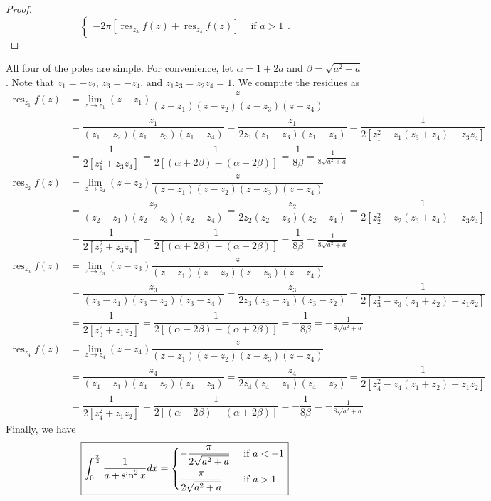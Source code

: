 \documentclass[10pt]{article}
\newcommand{\Int}{\displaystyle\int}
\DeclareMathOperator*{\res}{res}
\begin{document}
\begin{enumerate}
\begin{proof}
$$\begin{cases}
-2\pi [\res\nolimits_{z_3} f(z) + \res\nolimits_{z_4} f(z) ] & \text{ if } a > 1
\end{cases}.
$$
\end{proof}
All four of the poles are simple.  For convenience, let $\alpha = 1+2a$ and $\beta = \sqrt{a^2 + a}$.  Note that $z_1 = - z_2$, $z_3 = - z_4$, and $z_1z_3 = z_2z_4 = 1$.  We compute the residues as
\begin{align*}
\res\nolimits_{z_1} f(z) &= \lim_{z \rightarrow z_1} (z - z_1) \dfrac{z}{(z - z_1) (z - z_2) (z - z_3) (z - z_4)}
\\
&= \dfrac{z_1}{(z_1 - z_2) (z_1 - z_3) (z_1 - z_4)}
= \dfrac{z_1}{2z_1 (z_1 - z_3) (z_1 - z_4)}
= \dfrac{1}{2[z_1^2 - z_1(z_3 + z_4) + z_3z_4]}
\\
&= \dfrac{1}{2[z_1^2 + z_3z_4]}
= \dfrac{1}{2[(\alpha + 2 \beta) - (\alpha - 2\beta)]}
= \dfrac{1}{8\beta}
= \boxed{\frac{1}{8\sqrt{a^2 + a}}}
\\
\res\nolimits_{z_2} f(z) &= \lim_{z \rightarrow z_2} (z - z_2) \dfrac{z}{(z - z_1) (z - z_2) (z - z_3) (z - z_4)}
\\
&= \dfrac{z_2}{(z_2 - z_1) (z_2 - z_3) (z_2 - z_4)}
= \dfrac{z_2}{2z_2(z_2 - z_3) (z_2 - z_4)}
= \dfrac{1}{2[z_2^2 - z_2(z_3 + z_4) + z_3z_4]}
\\
&= \dfrac{1}{2[z_2^2 + z_3z_4]}
= \dfrac{1}{2[(\alpha + 2 \beta) - (\alpha - 2\beta)]}
= \dfrac{1}{8\beta}
= \boxed{\frac{1}{8\sqrt{a^2 + a}}}
\\
\res\nolimits_{z_3} f(z) &= \lim_{z \rightarrow z_3} (z - z_3) \dfrac{z}{(z - z_1) (z - z_2) (z - z_3) (z - z_4)}
\\
&= \dfrac{z_3}{(z_3 - z_1) (z_3 - z_2) (z_3 - z_4)}
= \dfrac{z_3}{2z_3(z_3 - z_1) (z_3 - z_2)}
= \dfrac{1}{2[z_3^2 - z_3(z_1 + z_2) + z_1z_2]}
\\
&= \dfrac{1}{2[z_3^2 + z_1z_2]}
= \dfrac{1}{2[(\alpha - 2 \beta) - (\alpha + 2\beta)]}
= -\dfrac{1}{8\beta}
= \boxed{-\frac{1}{8\sqrt{a^2 + a}}}
\\
\res\nolimits_{z_4} f(z) &= \lim_{z \rightarrow z_4} (z - z_4) \dfrac{z}{(z - z_1) (z - z_2) (z - z_3) (z - z_4)}
\\
&= \dfrac{z_4}{(z_4 - z_1) (z_4 - z_2) (z_4 - z_3)}
= \dfrac{z_4}{2z_4(z_4 - z_1) (z_4 - z_2)}
= \dfrac{1}{2[z_4^2 - z_4(z_1 + z_2) + z_1z_2]}
\\
&= \dfrac{1}{2[z_4^2 + z_1z_2]}
= \dfrac{1}{2[(\alpha - 2 \beta) - (\alpha + 2\beta)]}
= -\dfrac{1}{8\beta}
= \boxed{-\frac{1}{8\sqrt{a^2 + a}}}
\end{align*}
Finally, we have
$$
\boxed{
\Int_0^{\frac{\pi}{2}} \frac{1}{a + \sin^2 x} dx
=
\begin{cases}
- \dfrac{\pi}{2 \sqrt{a^2 + a}}& \text{ if } a < -1 \vspace{.2cm} \\
\dfrac{\pi}{2 \sqrt{a^2 + a}}& \text{ if } a > 1
\end{cases}}
$$



\end{enumerate}
\end{document}
